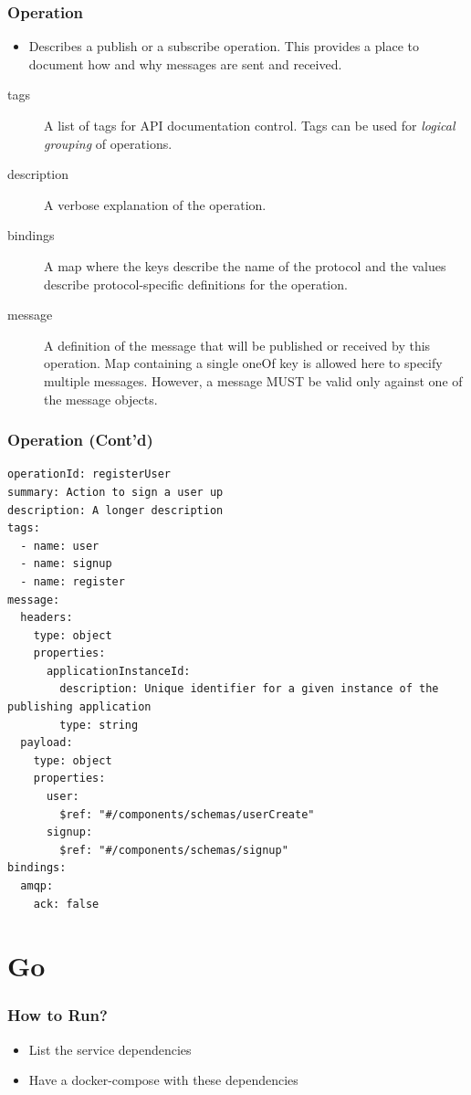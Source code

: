 \documentclass{efd-lecture}
\begin{document}
\begin{frame}[fragile]
  \frametitle{Operation}
  \begin{itemize}
    \item Describes a publish or a subscribe operation. This provides a place to document how and why messages are sent and received.
  \end{itemize}
  \begin{description}
    \item[tags] A list of tags for API documentation control. Tags can be used for \textit{\color{YellowOrange} logical grouping} of operations.
    \item[description] A verbose explanation of the operation.
    \item[bindings] A map where the keys describe the name of the protocol and the values describe protocol-specific definitions for the operation.
    \item[message] A definition of the message that will be published or received by this operation. Map containing a single oneOf key is allowed here to specify multiple messages.
      However, a message MUST be valid only against one of the message objects.
  \end{description}
\end{frame}

\begin{frame}[fragile]
  \frametitle{Operation (Cont'd)}
  \begin{verbatim}
operationId: registerUser
summary: Action to sign a user up
description: A longer description
tags:
  - name: user
  - name: signup
  - name: register
message:
  headers:
    type: object
    properties:
      applicationInstanceId:
        description: Unique identifier for a given instance of the publishing application
        type: string
  payload:
    type: object
    properties:
      user:
        $ref: "#/components/schemas/userCreate"
      signup:
        $ref: "#/components/schemas/signup"
bindings:
  amqp:
    ack: false
  \end{verbatim}
\end{frame}

\section{Go}

\begin{frame}
  \frametitle{How to Run?}
  \begin{itemize}
    \item List the service dependencies
    \item Have a docker-compose with these dependencies
  \end{itemize}
\end{frame}
\end{document}

